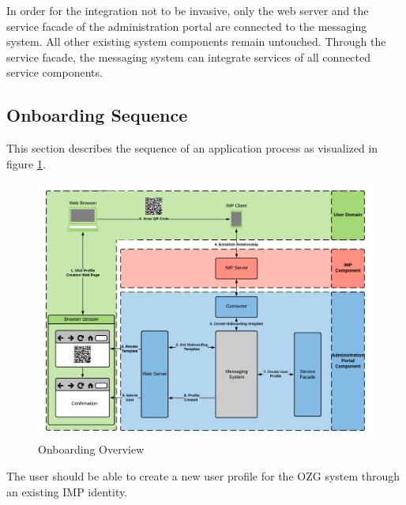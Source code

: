 In order for the integration not to be invasive, only the web server and the service facade of the administration portal are connected to the messaging system. All other existing system components remain untouched. Through the service facade, the messaging system can integrate services of all connected service components.

\subsection{Onboarding Sequence}
This section describes the sequence of an application process as visualized in figure \ref{integration1:onboarding_overview}.

\begin{figure}[h!]
    \centering
    \includegraphics[scale=0.6]{Diagrams/Integration Architecture 1/Technological Integration/5. Onboarding Overview.pdf}
    \caption{Onboarding Overview}
    \label{integration1:onboarding_overview}
\end{figure}

The user should be able to create a new user profile for the OZG system through an existing IMP identity. 

